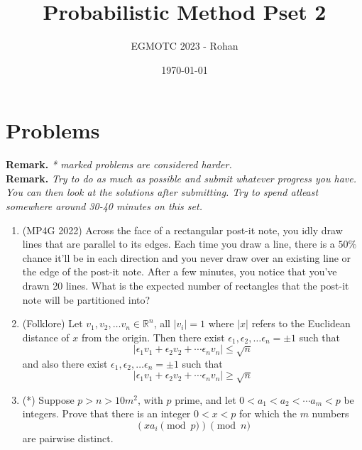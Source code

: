 \documentclass[12pt]{article}
\title{Probabilistic Method Pset 2}
\author{EGMOTC 2023 - Rohan}
\date{\today}
\begin{document}
\maketitle

\newcommand{\localtextbulletone}{\textcolor{black}{\raisebox{.45ex}{\rule{.6ex}{.6ex}}}}
\renewcommand{\labelitemi}{\localtextbulletone}

\section*{Problems}
\vspace{1cm}
\thispagestyle{empty}

\textbf{Remark.} \textit{* marked problems are considered harder.\\ }
\textbf{Remark.} \textit{Try to do as much as possible and submit whatever progress you have. You can then look at the solutions after submitting. Try to spend atleast somewhere around 30-40 minutes on this set.}

\begin{enumerate}
    \item (MP4G 2022) Across the face of a rectangular post-it note, you idly draw lines that are parallel to its edges. Each time you draw a line, there is a $50\%$ chance it'll be in each direction and you never draw over an existing line or the edge of the post-it note. After a few minutes, you notice that you've drawn 20 lines. What is the expected number of rectangles that the post-it note will be partitioned into?
    \item (Folklore) Let $v_1,v_2,\ldots v_n\in \mathbb{R}^n$, all $|v_i|=1$ where $|x|$ refers to the Euclidean distance of $x$ from the origin.  Then there exist $\epsilon_1, \epsilon_2, \ldots \epsilon_n = \pm 1$ such that \[|\epsilon_1v_1+\epsilon_2v_2+\cdots \epsilon_nv_n|\le \sqrt{n}\] and also there exist $\epsilon_1, \epsilon_2, \ldots \epsilon_n = \pm 1$ such that \[|\epsilon_1v_1+\epsilon_2v_2+\cdots \epsilon_nv_n|\ge \sqrt{n}\] 
    \item (*) Suppose $p>n>10m^2$, with $p$ prime, and let $0<a_1<a_2<\cdots a_m<p$ be integers. Prove that there is an integer $0<x<p$ for which the $m$ numbers \[(xa_i \pmod{p})\pmod n\] are pairwise distinct.
\end{enumerate}
\end{document}
